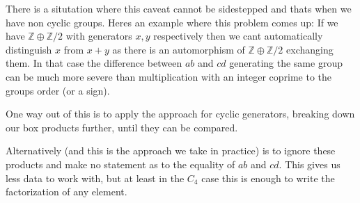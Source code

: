\begin{DoxyItemize}
\item There is a situtation where this caveat cannot be sidestepped and that\textquotesingle{}s when we have non cyclic groups. Here\textquotesingle{}s an example where this problem comes up\+: If we have $\mathbb Z\oplus \mathbb Z/2$ with generators $x,y$ respectively then we can\textquotesingle{}t automatically distinguish $x$ from $x+y$ as there is an automorphism of $\mathbb Z\oplus \mathbb Z/2$ exchanging them. In that case the difference between $ab$ and $cd$ generating the same group can be much more severe than multiplication with an integer coprime to the group\textquotesingle{}s order (or a sign).
\item One way out of this is to apply the approach for cyclic generators, breaking down our box products further, until they can be compared.
\item Alternatively (and this is the approach we take in practice) is to ignore these products and make no statement as to the equality of $ab$ and $cd$. This gives us less data to work with, but at least in the $C_4$ case this is enough to write the factorization of any element. 
\end{DoxyItemize}